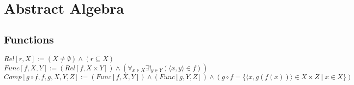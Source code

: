 \documentclass{book}
\newcommand{\abr}{:=}
\newcommand{\pipe}{$\phantom{(}\vrectangleblack\phantom{)}$}
\newcommand{\st}{\mathbin{|}}
\newcommand{\utup}[1]{\{#1\}}
\newcommand{\floor}[1]{\left\lfloor #1 \right\rfloor}
\begin{document}
\begin{comment}
$MantelThm \abr ((|G| = n) \land (e(G) > \floor{n^2 / 4})) \implies (\exists_{W}(Triangle[W, G]))$
\begin{enumerate}
  \lit $(\lnot \exists_{W}(Triangle[W, G])) \implies \ldots$
  \begin{enumerate}
    \lit $\lnot \exists_{W}(Triangle[W, G])$ \pipe $\forall_{\utup{x, y} \in E(G)}(\Gamma(x) \cap \Gamma(y) = \emptyset)$ \pipe $\forall_{\utup{x, y} \in E(G)}(d(x) + d(y) \leq n)$
    \lit $\sum \limits_{\utup{x, y} \in E(G)}^{ }(d(x) + d(y)) \leq n (e(G))$
    \lit $\sum \limits_{\utup{x, y} \in E(G)}^{ }(d(x) + d(y)) = \sum \limits_{v \in V(G)}^{ }((d(v))^2)$
    \lit $\sum \limits_{v \in V(G)}^{ }((d(v))^2) \leq n (e(G))$ \pipe $n \sum \limits_{v \in V(G)}^{ }((d(v))^2) \leq n^2 (e(G))$
    \lit $(SumDegrees) \land (CauchysInequality)$ \pipe $(2 e(G))^2 = (\sum \limits_{v \in V(G)}(d(v)))^2 \leq \sum \limits_{v \in V(G)}(d(v))^2$ %
    \lit $(2 e(G))^2 \leq n^2 (e(G))$ \pipe $e(G) \leq n^2 /4$
    \lit $(e(G) > \floor{n^2 / 4}) \land (e(G) \leq n^2 /4)$ \pipe $\bot$
  \end{enumerate}
  \lit $(\lnot \exists_{W}(Triangle[W, G])) \implies (\bot)$ \pipe $\exists_{W}(Triangle[W, G])$
\end{enumerate} \vspace{.75mm} \hrule \vspace{.75mm} \ \\

$ComponentEquiv \abr ((Component[W, G]) \land (x \in W)) \implies
\left(\begin{array}{ll}
  (W = \{y \in V(G) \st \exists_{P, V}(PathXY[P, (x, y), V, G])\}) \hfill \land \hfill \\
  (W = \{y \in V(G) \st d(x, y) \in \mathbb{N}\}) \hfill \land \hfill \\
  ((R = \{\langle u, v \rangle \st \utup{u, v} \in E(G)\}) \land (W = [x]_R)) \\
\end{array}\right)$ \\
\end{comment}



\newpage
\newpage
\newpage


\chapter{Abstract Algebra}
\section{Functions}
$Rel[r, X] \abr (X \neq \emptyset) \land (r \subseteq X)$ \\
$Func[f, X, Y] \abr (Rel[f, X \times Y]) \land (\forall_{x \in X} \exists!_{y \in Y}(\langle x, y \rangle \in f))$ \\
$Comp[g \circ f, f, g, X, Y, Z] \abr (Func[f, X, Y]) \land (Func[g, Y, Z]) \land (g \circ f = \{\langle x, g(f(x)) \rangle \in X \times Z \st x \in X\})$ \\
\end{document}
